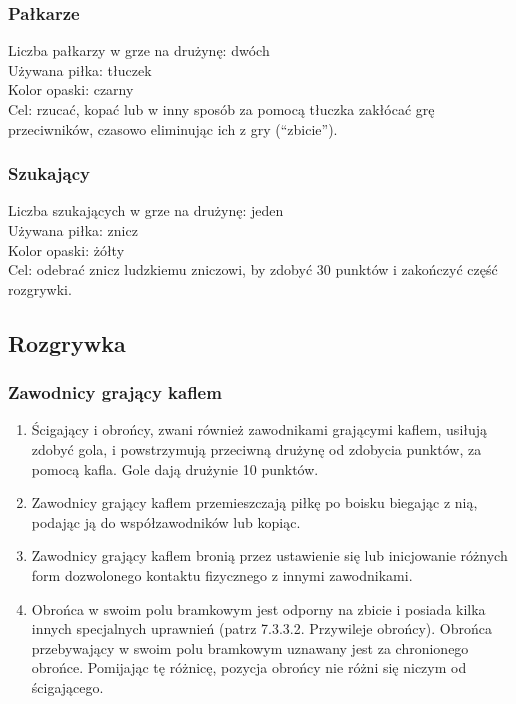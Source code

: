 \documentclass[12pt]{article}
\begin{document}
\subsubsection{Pałkarze}
Liczba pałkarzy w grze na drużynę: dwóch \\
Używana piłka: tłuczek \\
Kolor opaski: czarny \\
Cel: rzucać, kopać lub w inny sposób za pomocą tłuczka zakłócać grę
przeciwników, czasowo eliminując ich z gry (``zbicie'').

\subsubsection{Szukający}
Liczba szukających w grze na drużynę: jeden \\
Używana piłka: znicz \\
Kolor opaski: żółty \\
Cel: odebrać znicz ludzkiemu zniczowi, by zdobyć 30 punktów i zakończyć
część rozgrywki.

\subsection{Rozgrywka}

\subsubsection{Zawodnicy grający kaflem}
\begin{enumerate}
	\item Ścigający i obrońcy, zwani również zawodnikami grającymi kaflem,
	      usiłują zdobyć gola, i powstrzymują przeciwną drużynę od zdobycia
	      punktów, za pomocą kafla. Gole dają drużynie 10 punktów.

	\item Zawodnicy grający kaflem przemieszczają piłkę po boisku biegając z
	      nią, podając ją do współzawodników lub kopiąc.

	\item Zawodnicy grający kaflem bronią przez ustawienie się lub inicjowanie
	      różnych form dozwolonego kontaktu fizycznego z innymi zawodnikami.

	\item Obrońca w swoim polu bramkowym jest odporny na zbicie i posiada kilka
	      innych specjalnych uprawnień (patrz 7.3.3.2. Przywileje obrońcy).
	      Obrońca przebywający w swoim polu bramkowym uznawany jest za chronionego
	      obrońce. Pomijając tę różnicę, pozycja obrońcy nie różni się niczym od
	      ścigającego.
\end{enumerate}
\end{document}
